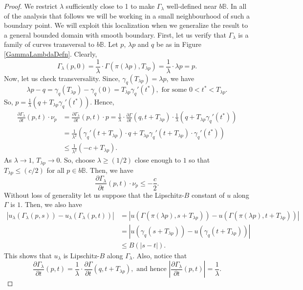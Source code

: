 \documentclass[12pt,a4paper]{amsart}
\numberwithin{equation}{section}
\theoremstyle{definition}
\begin{document}
\begin{proof}
We restrict $\lambda$ sufficiently close to 1 to make $\Gamma_\lambda$ well-defined near $b\mathbb{B}$. In all of the analysis that follows we will be working in a small 
neighbourhood of such a boundary point. We will exploit this localization when we generalize the result to a general bounded domain with smooth boundary. First, let us verify that 
$\Gamma_\lambda$ is a family of curves transversal to $b\mathbb{B}$. Let $p$, $\lambda p$ and $q$ be as in Figure \ref{GammaLambdaDefn}. Clearly,
\[\Gamma_\lambda(p,0) = \frac{1}{\lambda}\cdot\Gamma\left(\pi(\lambda p), T_{\lambda p}\right)=\frac{1}{\lambda}\cdot\lambda p=p.\]
Now, let us check transversality. Since, $\gamma_q\left(T_{\lambda p}\right) = \lambda p$, we have
\[\lambda p - q = \gamma_q\left(T_{\lambda p}\right) - \gamma_q(0) = T_{\lambda p}\gamma_q'(t^*), \text{ for some } 0 < t^* < T_{\lambda p}.\]
So, $p=\frac{1}{\lambda}\left(q+T_{\lambda p}\gamma_q'(t^*)\right)$. Hence,
\begin{align*}
\frac{\partial\Gamma_\lambda}{\partial t}(p,t)\cdot \nu_p &= \frac{\partial\Gamma_\lambda}{\partial t}(p,t)\cdot p = \frac{1}{\lambda}\cdot\frac{\partial\Gamma}{\partial t}(q,t+T_{\lambda p})\cdot\frac{1}{\lambda}\left(q+T_{\lambda p}\gamma_q'(t^*)\right)\\
&=\frac{1}{\lambda^2}\left(\gamma_q'(t+T_{\lambda p})\cdot q + T_{\lambda p}\gamma_q'(t+T_{\lambda p})\cdot\gamma_q'(t^*)\right)\\
&\le \frac{1}{\lambda^2}\left(-c+T_{\lambda p}\right).
\end{align*}
As $\lambda \to 1$, $T_{\lambda p} \to 0$. So, choose $\lambda \ge (1/2)$ close enough to $1$ so that $T_{\lambda p} \le (c/2)$ for all $p\in b\mathbb{B}$. Then, we have
\[\frac{\partial\Gamma_\lambda}{\partial t}(p,t)\cdot \nu_p \le -\frac{c}{2}.\]
Without loss of generality let us suppose that the Lipschitz-$B$ constant of $u$ along $\Gamma$ is $1$. Then, we also have
\begin{align*}
{\left\lvert{u_\lambda\left(\Gamma_\lambda(p,s)\right)-u_\lambda\left(\Gamma_\lambda(p,t)\right)}\right\rvert} &= {\left\lvert{u\left(\Gamma\left(\pi(\lambda p), s+T_{\lambda p}\right)\right)-u\left(\Gamma\left(\pi(\lambda p), t+T_{\lambda p}\right)\right)}\right\rvert}\\
&= {\left\lvert{u\left(\gamma_q(s+T_{\lambda p})\right)-u\left(\gamma_q(t+T_{\lambda p})\right)}\right\rvert}\\
&\le B\left({\left\lvert{s-t}\right\rvert}\right).
\end{align*}
This shows that $u_\lambda$ is Lipschitz-$B$ along $\Gamma_\lambda$. Also, notice that
\[\frac{\partial\Gamma_\lambda}{\partial t}(p,t) = \frac{1}{\lambda}\cdot\frac{\partial\Gamma}{\partial t}(q,t+T_{\lambda p}),\text{ and hence } {\left\lvert{\frac{\partial\Gamma_\lambda}{\partial t}(p,t)}\right\rvert} = \frac{1}{\lambda}.\]


\end{proof}
\end{document}
